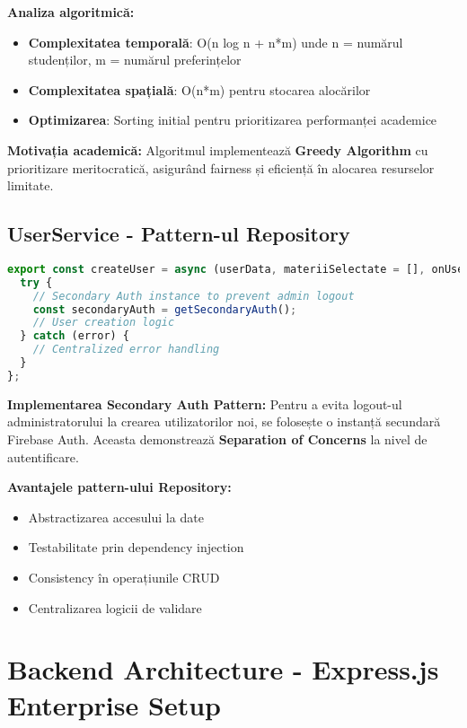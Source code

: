 \documentclass[11pt,a4paper]{article}
\begin{document}
\textbf{Analiza algoritmică:}
\begin{itemize}
    \item \textbf{Complexitatea temporală}: O(n log n + n*m) unde n = numărul studenților, m = numărul preferințelor
    \item \textbf{Complexitatea spațială}: O(n*m) pentru stocarea alocărilor
    \item \textbf{Optimizarea}: Sorting initial pentru prioritizarea performanței academice
\end{itemize}

\textbf{Motivația academică:} Algoritmul implementează \textbf{Greedy Algorithm} cu prioritizare meritocratică, asigurând fairness și eficiență în alocarea resurselor limitate.

\subsection{UserService - Pattern-ul Repository}

\begin{lstlisting}[language=JavaScript, caption=Repository Pattern Implementation]
export const createUser = async (userData, materiiSelectate = [], onUserCreated) => {
  try {
    // Secondary Auth instance to prevent admin logout
    const secondaryAuth = getSecondaryAuth();
    // User creation logic
  } catch (error) {
    // Centralized error handling
  }
};
\end{lstlisting}

\textbf{Implementarea Secondary Auth Pattern:} Pentru a evita logout-ul administratorului la crearea utilizatorilor noi, se folosește o instanță secundară Firebase Auth. Aceasta demonstrează \textbf{Separation of Concerns} la nivel de autentificare.

\textbf{Avantajele pattern-ului Repository:}
\begin{itemize}
    \item Abstractizarea accesului la date
    \item Testabilitate prin dependency injection
    \item Consistency în operațiunile CRUD
    \item Centralizarea logicii de validare
\end{itemize}

\section{Backend Architecture - Express.js Enterprise Setup}
\end{document}
